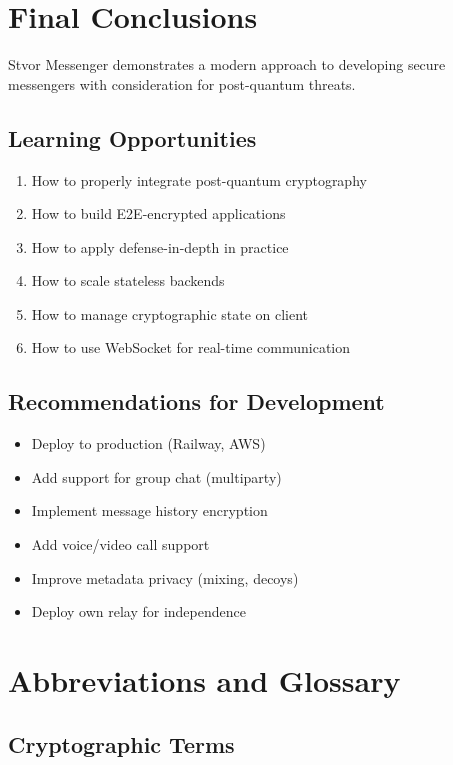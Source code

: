 \documentclass[11pt,a4paper,oneside]{book}
\begin{document}
\vspace{-0.5cm}\chapter{Final Conclusions}
Stvor Messenger demonstrates a modern approach to developing secure messengers with consideration for post-quantum threats.
\vspace{-0.3cm}\section{Learning Opportunities}
\begin{enumerate}
  \item How to properly integrate post-quantum cryptography
  \item How to build E2E-encrypted applications
  \item How to apply defense-in-depth in practice
  \item How to scale stateless backends
  \item How to manage cryptographic state on client
  \item How to use WebSocket for real-time communication
\end{enumerate}
\vspace{-0.3cm}\section{Recommendations for Development}
\begin{itemize}
  \item Deploy to production (Railway, AWS)
  \item Add support for group chat (multiparty)
  \item Implement message history encryption
  \item Add voice/video call support
  \item Improve metadata privacy (mixing, decoys)
  \item Deploy own relay for independence
\end{itemize}
\appendix
\vspace{-0.5cm}\chapter{Abbreviations and Glossary}
\vspace{-0.3cm}\section{Cryptographic Terms}
\end{document}
